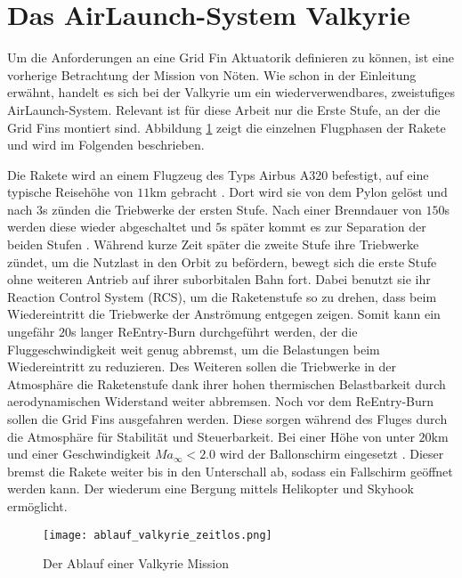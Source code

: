 \section{Das AirLaunch-System Valkyrie}
Um die Anforderungen an eine Grid Fin Aktuatorik definieren zu können, ist eine vorherige Betrachtung der Mission von Nöten. Wie schon in der Einleitung erwähnt, handelt es sich bei der Valkyrie um ein wiederverwendbares, zweistufiges AirLaunch-System.  Relevant ist für diese Arbeit nur die Erste Stufe, an der die Grid Fins montiert sind. Abbildung \ref{abb_valkMission} zeigt die einzelnen Flugphasen der Rakete und wird im Folgenden beschrieben.

Die Rakete wird an einem Flugzeug des Typs Airbus A320 befestigt, auf eine typische Reisehöhe von $11$km gebracht \cite{flugbahnBarz}. Dort wird sie von dem Pylon gelöst und nach $3$s zünden die Triebwerke der ersten Stufe. Nach einer Brenndauer von $150$s werden diese wieder abgeschaltet und $5$s später kommt es zur Separation der beiden Stufen \cite{flugbahnBarz}. Während kurze Zeit später die zweite Stufe ihre Triebwerke zündet, um die Nutzlast in den Orbit zu befördern, bewegt sich die erste Stufe ohne weiteren Antrieb auf ihrer suborbitalen Bahn fort. Dabei benutzt sie ihr Reaction Control System (RCS), um die Raketenstufe so zu drehen, dass beim Wiedereintritt die Triebwerke der Anströmung entgegen zeigen. Somit kann ein ungefähr $20$s langer ReEntry-Burn durchgeführt werden, der die Fluggeschwindigkeit weit genug abbremst, um die Belastungen beim Wiedereintritt zu reduzieren. Des Weiteren sollen die Triebwerke in der Atmosphäre die Raketenstufe dank ihrer hohen thermischen Belastbarkeit durch aerodynamischen Widerstand weiter abbremsen. Noch vor dem ReEntry-Burn sollen die Grid Fins ausgefahren werden. Diese sorgen während des Fluges durch die Atmosphäre für Stabilität und Steuerbarkeit. Bei einer Höhe von unter $20$km und einer Geschwindigkeit $Ma_\infty<2.0$ wird der Ballonschirm eingesetzt \cite{flugbahnBarz}. Dieser bremst die Rakete weiter bis in den Unterschall ab, sodass ein Fallschirm geöffnet werden kann. Der wiederum eine Bergung mittels Helikopter und Skyhook ermöglicht.
\begin{figure}[h]
	\centering
	\texttt{[image: ablauf\_valkyrie\_zeitlos.png]}
	\begin{flushright}
	\end{flushright}
	\caption{Der Ablauf einer Valkyrie Mission}
	\label{abb_valkMission}
\end{figure}\\
